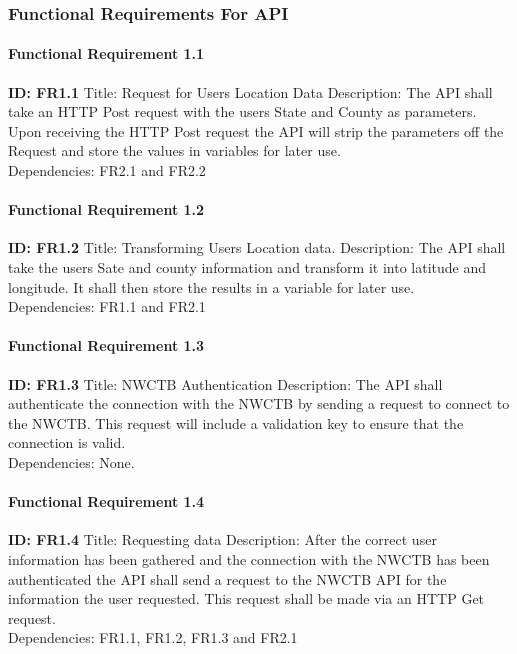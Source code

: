 \documentclass[onecolumn, draftclsnofoot,10pt, compsoc]{article}
\begin{document}
			\subsubsection{Functional Requirements For API}
					\paragraph{Functional Requirement 1.1}
						\textbf{ID: FR1.1} \hfill \break
						Title: Request for Users Location Data\hfill \break
						Description: The API shall take an HTTP Post request with the users State and County as parameters. Upon receiving the HTTP Post request the API will strip the parameters off the Request and store the values in variables for later use.\\
						Dependencies: FR2.1 and FR2.2\hfill \break

					\paragraph{Functional Requirement 1.2}
						\textbf{ID: FR1.2}\hfill \break
						Title: Transforming Users Location data.\hfill \break
						Description: The API shall take the users Sate and county information and transform it into latitude and longitude. It shall then store the results in a variable for later use.\\
						Dependencies: FR1.1 and FR2.1\hfill \break

					\paragraph{Functional Requirement 1.3}
						\textbf{ID: FR1.3}\hfill \break
						Title: NWCTB Authentication \hfill \break
						Description: The API shall authenticate the connection with the NWCTB by sending a request to connect to the NWCTB. This request will include a validation key to ensure that the connection is valid.\\
						Dependencies: None.\hfill \break

					\paragraph{Functional Requirement 1.4}
						\textbf{ID: FR1.4}\hfill \break
						Title: Requesting data\hfill \break
						Description: After the correct user information has been gathered and the connection with the NWCTB has been authenticated the API shall send a request to the NWCTB API for the information the user requested. This request shall be made via an HTTP Get request.\\
						Dependencies: FR1.1, FR1.2, FR1.3 and FR2.1\hfill \break
\end{document}
